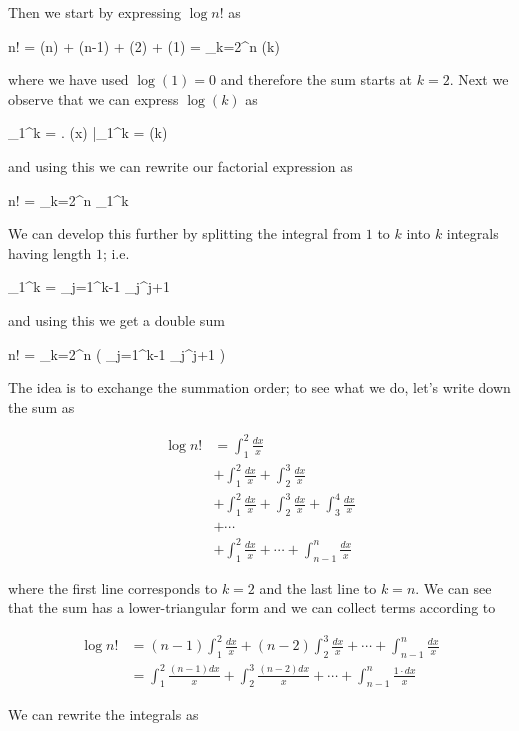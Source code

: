 Then we start by expressing $\log n!$ as

\bee
\log n! = \log(n) + \log(n-1) + \cdots \log(2) + \log(1) = \sum_{k=2}^n \log(k)
\eee

where we have used $\log(1) = 0$ and therefore the sum starts at $k=2$. Next we observe that we can express $\log(k)$ as

\bee
\int_1^k  = \left. \log(x) \right|_1^k = \log(k)
\eee

and using this we can rewrite our factorial expression as

\bee
\log n! = \sum_{k=2}^n \int_1^k 
\eee

We can develop this further by splitting the integral from $1$ to $k$ into $k$ integrals having length $1$; i.e.

\bee
\int_1^k  = \sum_{j=1}^{k-1} \int_{j}^{j+1} 
\eee

and using this we get a double sum

\bee
\log n! = \sum_{k=2}^n \left( \sum_{j=1}^{k-1} \int_{j}^{j+1}  \right)
\eee

The idea is to exchange the summation order; to see what we do, let's write down the sum as

\begin{align*}
  \log n! &= \int_{1}^{2} \frac{dx}{x} \\
          &+ \int_{1}^{2} \frac{dx}{x}  + \int_{2}^{3} \frac{dx}{x} \\
          &+ \int_{1}^{2} \frac{dx}{x}  + \int_{2}^{3} \frac{dx}{x} + \int_{3}^{4} \frac{dx}{x}\\
          &+ \cdots \\
          &+ \int_{1}^{2} \frac{dx}{x} + \cdots + \int_{n-1}^{n} \frac{dx}{x}
\end{align*}

where the first line corresponds to $k=2$ and the last line to $k=n$. We can see that the sum has a lower-triangular form and we can collect terms according to

\begin{align*}
  \log n! &= (n-1) \int_{1}^{2} \frac{dx}{x} + (n-2) \int_{2}^{3} \frac{dx}{x} + \cdots + \int_{n-1}^{n} \frac{dx}{x} \\
          &= \int_{1}^{2} \frac{(n-1) dx}{x} + \int_{2}^{3} \frac{(n-2) dx}{x} + \cdots + \int_{n-1}^{n} \frac{1 \cdot dx}{x}
\end{align*}

We can rewrite the integrals as

